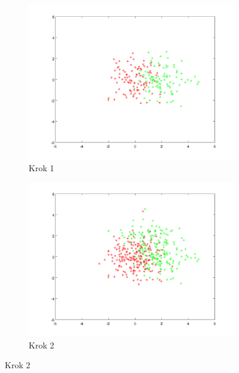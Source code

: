 \documentclass[10pt,a4paper]{article}
\begin{document}
\begin{figure}[H]
  \begin{subfigure}[b]{0.4\textwidth}
    \includegraphics[width=\textwidth]{dataGen_step0.png}
    \caption{Krok 1}
  \end{subfigure}
  \hfill
  \begin{subfigure}[b]{0.4\textwidth}
    \includegraphics[width=\textwidth]{dataGen_step1.png}
    \caption{Krok 2}
  \end{subfigure}


\end{figure}
\end{document}
